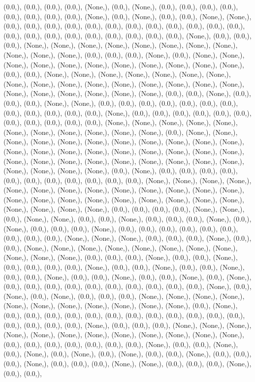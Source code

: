 \documentclass{article}
\begin{document}
(0.0,), (0.0,), (0.0,), (0.0,), (None,), (0.0,), (None,), (0.0,), (0.0,), (0.0,), (0.0,), (0.0,), (0.0,), (0.0,), (0.0,), (None,), (0.0,), (None,), (0.0,), (0.0,), (None,), (None,), (0.0,), (0.0,), (0.0,), (0.0,), (0.0,), (0.0,), (0.0,), (0.0,), (0.0,), (0.0,), (0.0,), (0.0,), (0.0,), (0.0,), (0.0,), (0.0,), (0.0,), (0.0,), (0.0,), (0.0,), (0.0,), (None,), (0.0,), (0.0,), (0.0,), (None,), (None,), (None,), (None,), (None,), (None,), (None,), (None,), (None,), (None,), (None,), (0.0,), (0.0,), (0.0,), (None,), (0.0,), (None,), (None,), (None,), (None,), (None,), (None,), (None,), (None,), (None,), (None,), (None,), (0.0,), (0.0,), (None,), (None,), (None,), (None,), (None,), (None,), (None,), (None,), (None,), (None,), (None,), (None,), (None,), (None,), (None,), (None,), (None,), (None,), (None,), (None,), (None,), (None,), (0.0,), (0.0,), (None,), (0.0,), (0.0,), (0.0,), (None,), (None,), (0.0,), (0.0,), (0.0,), (0.0,), (0.0,), (0.0,), (0.0,), (0.0,), (0.0,), (0.0,), (0.0,), (0.0,), (None,), (0.0,), (0.0,), (0.0,), (0.0,), (0.0,), (0.0,), (0.0,), (0.0,), (0.0,), (0.0,), (0.0,), (None,), (None,), (None,), (None,), (None,), (None,), (None,), (None,), (None,), (None,), (None,), (0.0,), (None,), (None,), (None,), (None,), (None,), (None,), (None,), (None,), (None,), (None,), (None,), (None,), (None,), (None,), (None,), (None,), (None,), (None,), (None,), (None,), (None,), (None,), (None,), (None,), (None,), (None,), (None,), (None,), (None,), (None,), (None,), (None,), (None,), (0.0,), (None,), (0.0,), (0.0,), (0.0,), (0.0,), (0.0,), (0.0,), (0.0,), (0.0,), (0.0,), (0.0,), (0.0,), (None,), (None,), (None,), (None,), (None,), (None,), (None,), (None,), (None,), (None,), (None,), (None,), (None,), (None,), (None,), (None,), (None,), (None,), (None,), (None,), (None,), (None,), (None,), (None,), (None,), (None,), (0.0,), (0.0,), (0.0,), (0.0,), (None,), (None,), (0.0,), (None,), (None,), (0.0,), (0.0,), (None,), (0.0,), (0.0,), (0.0,), (None,), (0.0,), (None,), (0.0,), (0.0,), (0.0,), (None,), (0.0,), (0.0,), (0.0,), (0.0,), (0.0,), (0.0,), (0.0,), (0.0,), (0.0,), (None,), (None,), (None,), (0.0,), (0.0,), (0.0,), (None,), (0.0,), (0.0,), (None,), (None,), (None,), (None,), (None,), (None,), (None,), (None,), (None,), (None,), (None,), (0.0,), (0.0,), (0.0,), (None,), (0.0,), (0.0,), (None,), (0.0,), (0.0,), (0.0,), (0.0,), (None,), (0.0,), (0.0,), (None,), (0.0,), (0.0,), (None,), (0.0,), (0.0,), (None,), (0.0,), (0.0,), (None,), (0.0,), (0.0,), (None,), (0.0,), (None,), (0.0,), (0.0,), (0.0,), (0.0,), (0.0,), (0.0,), (0.0,), (0.0,), (0.0,), (0.0,), (None,), (0.0,), (None,), (0.0,), (None,), (0.0,), (0.0,), (0.0,), (None,), (None,), (None,), (None,), (None,), (None,), (None,), (None,), (None,), (None,), (None,), (0.0,), (None,), (0.0,), (0.0,), (0.0,), (0.0,), (0.0,), (0.0,), (0.0,), (0.0,), (0.0,), (0.0,), (0.0,), (0.0,), (0.0,), (0.0,), (0.0,), (0.0,), (None,), (0.0,), (0.0,), (0.0,), (None,), (None,), (None,), (None,), (None,), (None,), (None,), (None,), (None,), (None,), (None,), (None,), (0.0,), (0.0,), (0.0,), (0.0,), (0.0,), (0.0,), (0.0,), (None,), (0.0,), (0.0,), (None,), (0.0,), (None,), (0.0,), (None,), (0.0,), (None,), (0.0,), (0.0,), (None,), (0.0,), (0.0,), (0.0,), (None,), (0.0,), (0.0,), (0.0,), (None,), (None,), (0.0,), (0.0,), (0.0,), (None,), (0.0,), (0.0,), 
\end{document}
